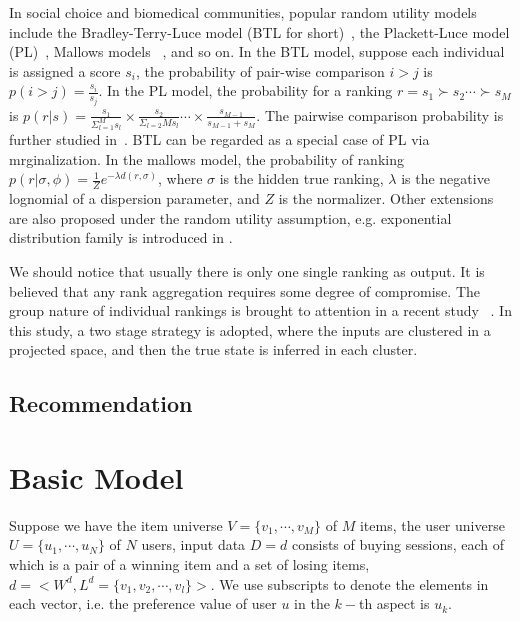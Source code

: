 \documentclass[sigconf]{acmart}
\begin{document}
In social choice and biomedical communities, popular random utility models include the Bradley-Terry-Luce model (BTL for short)~\cite{Hunter2004MM}, the Plackett-Luce model (PL)~\cite{AzariSoufiani2013Generalized}, Mallows models ~\cite{Lu2011Learning}, and so on. In the BTL model, suppose each individual is assigned a score $s_i$, the probability of pair-wise comparison $i>j$ is $p(i>j)=\frac{s_i}{s_j}$. In the PL model, the probability for a ranking $r=s_1 \succ s_2 \cdots \succ s_M$ is $ p(r|s)=\frac{s_1}{\Sigma_{l=1}^{M} s_l} \times \frac{s_2}{\Sigma_{l=2}{M} s_l} \cdots \times \frac{s_{M-1}}{s_{M-1}+s_{M}}$. The pairwise comparison probability is further studied in~\cite{Gleich2011Rank}. BTL can be regarded as a special case of PL via mrginalization. In the mallows model, the probability of ranking $p(r|\sigma,\phi)=\frac{1}{Z} e^{-\lambda d(r,\sigma)}$, where $\sigma$ is the hidden true ranking, $\lambda$ is the negative lognomial of a dispersion parameter, and $Z$ is the normalizer. Other extensions are also proposed under the random utility assumption, e.g. exponential distribution family is introduced in \cite{Parkes2012Random}.

We should notice that usually there is only one single ranking as output. It is believed that any rank aggregation requires some degree of compromise. The group nature of individual rankings is brought to attention in a recent study ~\cite{Wu2015Clustering}. In this study, a two stage strategy is adopted, where the inputs are clustered in a projected space, and then the true state is inferred in each cluster.



\subsection{Recommendation}



\section{Basic Model}\label{sec:model1}

Suppose we have the item universe $V=\{v_1,\cdots,v_M\}$ of $M$ items, the user universe $U=\{u_1,\cdots,u_N\}$ of $N$ users, input data $D={d}$ consists of buying sessions, each of which is a pair of a winning item and a set of losing items, $d=<W^d,L^d=\{v_1,v_2,\cdots,v_l\}>$. We use subscripts to denote the elements in each vector, i.e. the preference value of user $u$ in the $k-$th aspect is $u_k$. 
\end{document}
